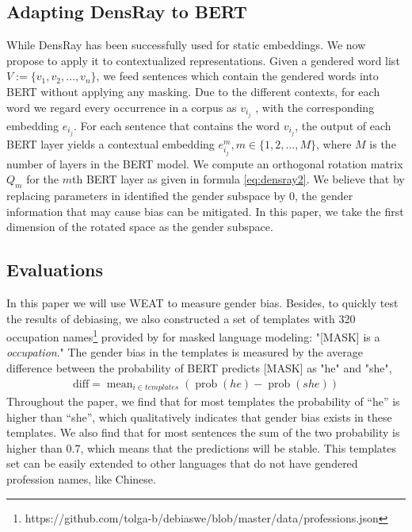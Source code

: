 \subsection{Adapting DensRay to BERT}
While DensRay has been successfully used for static embeddings. We now propose to apply it to contextualized representations. Given a gendered word list $V:=\{v_1,v_2,\dots,v_n\}$, we feed sentences which contain the gendered words into BERT without applying any masking. Due to the different contexts, for each word we regard every occurrence in a corpus as $v_{i_j}$ , with the corresponding embedding $e_{i_j}$. For each sentence that contains the word $v_{i_j}$, the output of each BERT layer yields a contextual embedding $e_{i_j}^m,m\in\{1,2,\dots,M\}$, where $M$ is the number of layers in the BERT model. We compute an orthogonal rotation matrix $Q_m$ for the $m$th BERT layer as given in formula \ref{eq:densray2}. We believe that by replacing parameters in identified the gender subspace by $0$, the gender information that may cause bias can be mitigated. In this paper, we take the first dimension of the rotated space as the gender subspace.

\subsection{Evaluations}\label{sec:eval}
In this paper we will use WEAT to measure gender bias. Besides, to quickly test the results of debiasing, we also constructed a set of templates with 320 occupation names\footnote{https://github.com/tolga-b/debiaswe/blob/master/data/professions.json} provided by \citet{bolukbasi2016man} for masked language modeling: "[MASK] is a \textit{occupation}." The gender bias in the templates is measured by the average difference between the probability of BERT predicts [MASK] as "he" and "she",
\begin{eqnarray}
    \text{diff}=\mathop{mean}_{i \in templates}(\mathop{prob}(he)-\mathop{prob}(she))\nonumber
\end{eqnarray}
Throughout the paper, we find that for most templates the probability of ``he'' is higher than ``she'', which qualitatively indicates that gender bias exists in these templates. We also find that for most sentences the sum of the two probability is higher than 0.7, which means that the predictions will be stable. This templates set can be easily extended to other languages that do not have gendered profession names, like Chinese.
